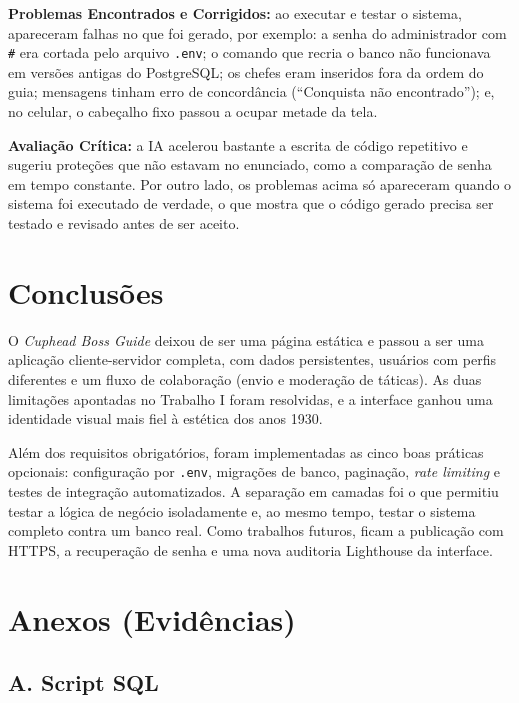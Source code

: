 \documentclass[12pt,a4paper]{article}
\newcommand{\cod}[1]{\texttt{#1}}
\begin{document}
\textbf{Problemas Encontrados e Corrigidos:} ao executar e testar o sistema,
apareceram falhas no que foi gerado, por exemplo: a senha do administrador com
\cod{\#} era cortada pelo arquivo \cod{.env}; o comando que recria o banco não
funcionava em versões antigas do PostgreSQL; os chefes eram inseridos fora da
ordem do guia; mensagens tinham erro de concordância (``Conquista não
encontrado''); e, no celular, o cabeçalho fixo passou a ocupar metade da tela.

\textbf{Avaliação Crítica:} a IA acelerou bastante a escrita de código
repetitivo e sugeriu proteções que não estavam no enunciado, como a comparação de
senha em tempo constante. Por outro lado, os problemas acima só apareceram quando
o sistema foi executado de verdade, o que mostra que o código gerado precisa ser
testado e revisado antes de ser aceito.

\section{Conclusões}

O \textit{Cuphead Boss Guide} deixou de ser uma página estática e passou a ser
uma aplicação cliente-servidor completa, com dados persistentes, usuários com
perfis diferentes e um fluxo de colaboração (envio e moderação de táticas). As
duas limitações apontadas no Trabalho I foram resolvidas, e a interface ganhou
uma identidade visual mais fiel à estética dos anos 1930.

Além dos requisitos obrigatórios, foram implementadas as cinco boas práticas
opcionais: configuração por \cod{.env}, migrações de banco, paginação,
\textit{rate limiting} e testes de integração automatizados. A separação em
camadas foi o que permitiu testar a lógica de negócio isoladamente e, ao mesmo
tempo, testar o sistema completo contra um banco real. Como trabalhos futuros,
ficam a publicação com HTTPS, a recuperação de senha e uma nova auditoria
Lighthouse da interface.

\section{Anexos (Evidências)}

\subsection*{A. Script SQL}
\end{document}
